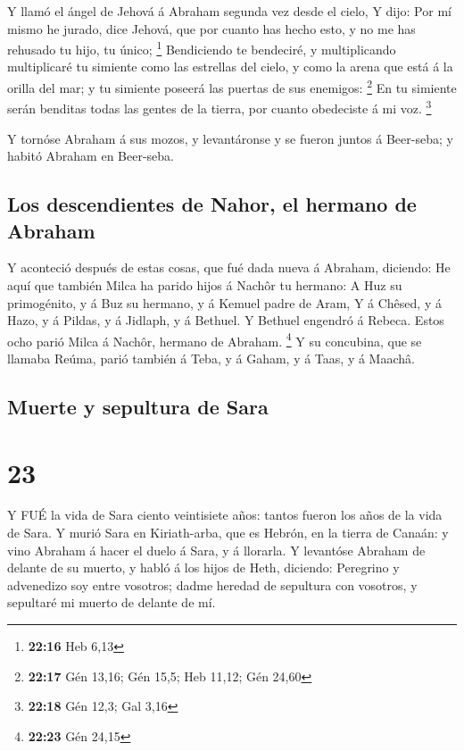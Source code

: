  Y llamó el ángel de Jehová á Abraham segunda vez desde el
cielo,  Y dijo: Por mí mismo he jurado, dice Jehová, que
por cuanto has hecho esto, y no me has rehusado tu hijo, tu único;
\footnote{\textbf{22:16} Heb 6,13}  Bendiciendo te
bendeciré, y multiplicando multiplicaré tu simiente como las estrellas
del cielo, y como la arena que está á la orilla del mar; y tu simiente
poseerá las puertas de sus enemigos: \footnote{\textbf{22:17} Gén 13,16;
  Gén 15,5; Heb 11,12; Gén 24,60}  En tu simiente serán
benditas todas las gentes de la tierra, por cuanto obedeciste á mi voz.
\footnote{\textbf{22:18} Gén 12,3; Gal 3,16}

 Y tornóse Abraham á sus mozos, y levantáronse y se fueron
juntos á Beer-seba; y habitó Abraham en Beer-seba.

\hypertarget{los-descendientes-de-nahor-el-hermano-de-abraham}{%
\subsection{Los descendientes de Nahor, el hermano de
Abraham}\label{los-descendientes-de-nahor-el-hermano-de-abraham}}

 Y aconteció después de estas cosas, que fué dada nueva á
Abraham, diciendo: He aquí que también Milca ha parido hijos á Nachôr tu
hermano:  A Huz su primogénito, y á Buz su hermano, y á
Kemuel padre de Aram,  Y á Chêsed, y á Hazo, y á Pildas, y
á Jidlaph, y á Bethuel.  Y Bethuel engendró á Rebeca. Estos
ocho parió Milca á Nachôr, hermano de Abraham. \footnote{\textbf{22:23}
  Gén 24,15}  Y su concubina, que se llamaba Reúma, parió
también á Teba, y á Gaham, y á Taas, y á Maachâ.

\hypertarget{muerte-y-sepultura-de-sara}{%
\subsection{Muerte y sepultura de
Sara}\label{muerte-y-sepultura-de-sara}}

\hypertarget{section-22}{%
\section{23}\label{section-22}}

 Y FUÉ la vida de Sara ciento veintisiete años: tantos
fueron los años de la vida de Sara.  Y murió Sara en
Kiriath-arba, que es Hebrón, en la tierra de Canaán: y vino Abraham á
hacer el duelo á Sara, y á llorarla.  Y levantóse Abraham de
delante de su muerto, y habló á los hijos de Heth, diciendo:
 Peregrino y advenedizo soy entre vosotros; dadme heredad de
sepultura con vosotros, y sepultaré mi muerto de delante de mí.

